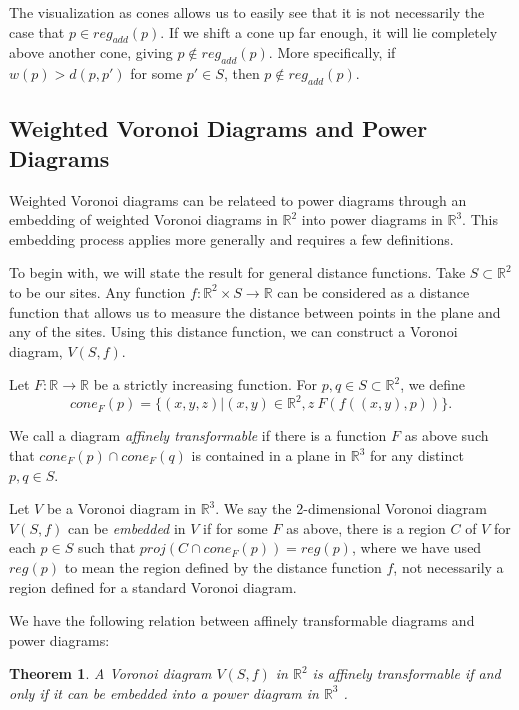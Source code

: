 \documentclass[a4paper, 11pt]{article}
\newtheorem{theorem}{Theorem}[section]
\newcommand{\R}{\mathbb{R}}
\begin{document}
The visualization as cones allows us to easily see that it is not necessarily the case that $p \in reg_{add}(p)$. If we shift a cone up far enough, it
will lie completely above another cone, giving $p \notin reg_{add}(p)$. More specifically, if $w(p) > d(p,p')$ for some $p' \in S$, then $p \notin
reg_{add}(p)$.

\subsection{Weighted Voronoi Diagrams and Power Diagrams}

Weighted Voronoi diagrams can be relateed to power diagrams through an embedding of weighted Voronoi diagrams in $\R^2$ into power diagrams in $\R^3$.
This embedding process applies more generally and requires a few definitions.

To begin with, we will state the result for general distance functions. Take $S \subset \R^2$ to be our sites. Any function $f: \R^2 \times S \to \R$
can be considered as a distance function that allows us to measure the distance between points in the plane and any of the sites. Using this distance
function, we can construct a Voronoi diagram, $V(S,f)$.

Let $F: \R \to \R$ be a strictly increasing function. For $p,q \in S \subset \R^2$, we define
\[ cone_F(p) = \{ (x,y,z) | (x,y) \in \R^2, z \ F( f( (x,y), p) ) \}. \]

We call a diagram \textit{affinely transformable} if there is a function $F$ as above such that $cone_F(p) \cap cone_F(q)$ is contained in a plane in $\R^3$ for any distinct
$p,q \in S$.

Let $V$ be a Voronoi diagram in $\R^3$. We say the 2-dimensional Voronoi diagram $V(S,f)$ can be \textit{embedded} in $V$ if for some $F$ as above,
there is a region $C$ of $V$ for each $p \in S$ such that $proj( C \cap cone_F(p)) = reg(p)$, where we have used $reg(p)$ to mean the region defined
by the distance function $f$, not necessarily a region defined for a standard Voronoi diagram.

We have the following relation between affinely transformable diagrams and power diagrams:

\begin{theorem}
  \label{thm:affine}
  A Voronoi diagram $V(S,f)$ in $\R^2$ is affinely transformable if and only if it can be embedded into a power diagram in $\R^3$
  \cite{aurenhammer_additive}.
\end{theorem}
\end{document}
